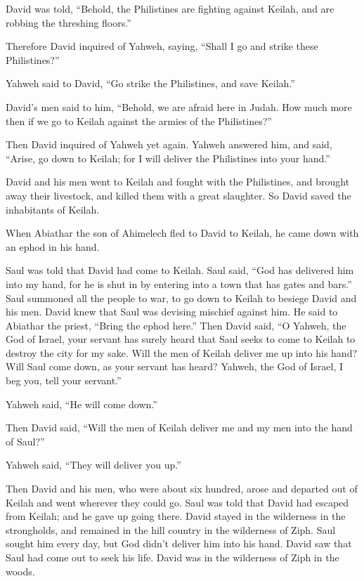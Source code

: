  David was told, ``Behold, the Philistines are fighting
against Keilah, and are robbing the threshing floors.''

 Therefore David inquired of Yahweh, saying, ``Shall I go
and strike these Philistines?''

Yahweh said to David, ``Go strike the Philistines, and save Keilah.''

 David's men said to him, ``Behold, we are afraid here in
Judah. How much more then if we go to Keilah against the armies of the
Philistines?''

 Then David inquired of Yahweh yet again. Yahweh answered
him, and said, ``Arise, go down to Keilah; for I will deliver the
Philistines into your hand.''

 David and his men went to Keilah and fought with the
Philistines, and brought away their livestock, and killed them with a
great slaughter. So David saved the inhabitants of Keilah.

 When Abiathar the son of Ahimelech fled to David to Keilah,
he came down with an ephod in his hand.

 Saul was told that David had come to Keilah. Saul said,
``God has delivered him into my hand, for he is shut in by entering into
a town that has gates and bars.''  Saul summoned all the
people to war, to go down to Keilah to besiege David and his men.
 David knew that Saul was devising mischief against him. He
said to Abiathar the priest, ``Bring the ephod here.'' 
Then David said, ``O Yahweh, the God of Israel, your servant has surely
heard that Saul seeks to come to Keilah to destroy the city for my sake.
 Will the men of Keilah deliver me up into his hand? Will
Saul come down, as your servant has heard? Yahweh, the God of Israel, I
beg you, tell your servant.''

Yahweh said, ``He will come down.''

 Then David said, ``Will the men of Keilah deliver me and
my men into the hand of Saul?''

Yahweh said, ``They will deliver you up.''

 Then David and his men, who were about six hundred, arose
and departed out of Keilah and went wherever they could go. Saul was
told that David had escaped from Keilah; and he gave up going there.
 David stayed in the wilderness in the strongholds, and
remained in the hill country in the wilderness of Ziph. Saul sought him
every day, but God didn't deliver him into his hand.  David
saw that Saul had come out to seek his life. David was in the wilderness
of Ziph in the woods.

